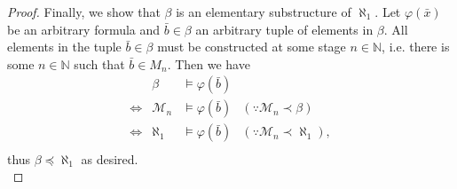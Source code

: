 \documentclass{article}
\begin{document}
\begin{enumerate}[label={\bf Q\arabic*:}]
\begin{enumerate}[label={\bf(\arabic*)}]
\begin{proof}
          Finally, we show that $\beta$ is an elementary substructure of
          $\aleph_1$. Let $\varphi(\bar{x})$ be an arbitrary formula and
          $\bar{b}\in\beta$ an arbitrary tuple of elements in $\beta$.  All
          elements in the tuple $\bar{b}\in\beta$ must be constructed at
          some stage $n\in\mathbb{N}$, i.e. there is some $n\in\mathbb{N}$
          such that $\bar{b}\in M_n$. Then we have
          \[\begin{array}{crll}
            &\beta &\models\varphi(\bar{b}) & \\
            \Leftrightarrow &\mathcal{M}_n &\models\varphi(\bar{b})
              &(\because\mathcal{M}_n\prec\beta) \\
            \Leftrightarrow &\aleph_1 &\models\varphi(\bar{b})
              &(\because\mathcal{M}_{n}\prec\aleph_1), \\
          \end{array}\]
          thus $\beta\preceq\aleph_1$ as desired. \\
        \end{proof}
    \end{enumerate}
\end{enumerate}
\end{document}
